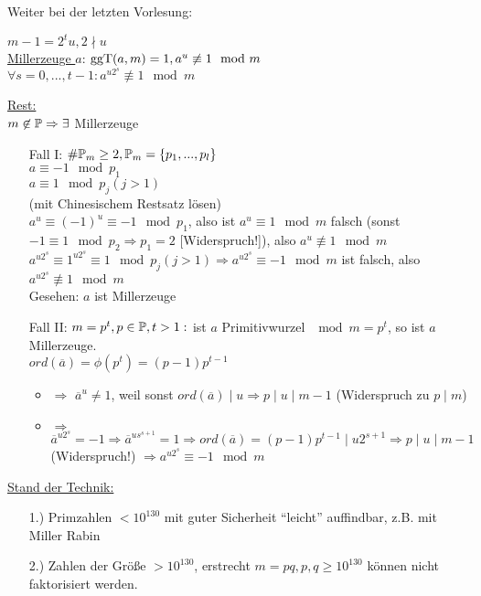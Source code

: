 \documentclass[a4paper,twoside,DIV15,BCOR12mm]{scrbook}
\begin{document}
Weiter bei der letzten Vorlesung:

$m-1 = 2^tu, 2 \nmid u$\\
\underline{Millerzeuge $a$}: $\mathop{\rm ggT}\nolimits (a,m) = 1, a^u \not\equiv 1 \mod m$\\
$\forall s = 0, ..., t-1: a^{u2^s} \not\equiv 1 \mod m$

\underline{Rest:}\\
$m \not\in \mathbb{P} \Rightarrow \exists$ Millerzeuge
\begin{itemize}
    \item[Fall I:] $\#\mathbb{P}_m \ge 2, \mathbb{P}_m = \{p_1,...,p_l\}$\\
        $a \equiv -1 \mod p_1$\\
        $a \equiv 1 \mod p_j (j > 1)$\\
        (mit Chinesischem Restsatz lösen)\\
        $a^u \equiv (-1)^u \equiv -1 \mod p_1$, also ist $a^u \equiv 1 \mod m$ falsch (sonst $-1 \equiv 1 \mod p_2 \Rightarrow p_1 = 2$ [Widerspruch!]), also $a^u \not\equiv 1 \mod m$\\
        $a^{u2^s} \equiv 1^{u2^s} \equiv 1 \mod p_j (j > 1) \Rightarrow a^{u2^s} \equiv -1 \mod m$ ist falsch, also $a^{u2^s} \not\equiv 1 \mod m$\\
        Gesehen: $a$ ist Millerzeuge
    \item[Fall II:] $m = p^t, p \in \mathbb{P}, t > 1:$ ist $a$ Primitivwurzel $\mod m = p^t$, so ist $a$ Millerzeuge.\\
        $ord(\overline a) = \phi(p^t) = (p-1)p^{t-1}$
        \begin{itemize}
            \item{ $\Rightarrow$} $\overline a^u \not= 1$, weil sonst $ord(\overline a) \mid u \Rightarrow p \mid u \mid m-1$ (Widerspruch zu $p \mid m$)
            \item{ $\Rightarrow$} $\overline a^{u2^s} = -1 \Rightarrow \overline a^{us^{s+1}} = 1 \Rightarrow ord(\overline a) = (p-1)p^{t-1} \mid u2^{s+1} \Rightarrow p \mid u \mid m-1$ (Widerspruch!) $\Rightarrow a^{u2^s} \equiv -1 \mod m$
        \end{itemize}
\end{itemize}

\underline{Stand der Technik:}
\begin{itemize}
    \item[1.)] Primzahlen $< 10^{130}$ mit guter Sicherheit "`leicht"' auffindbar, z.B. mit Miller Rabin
    \item[2.)] Zahlen der Größe $> 10^{130}$, erstrecht $m = pq, p,q \ge 10^{130}$ können nicht faktorisiert werden.
\end{itemize}
\end{document}
